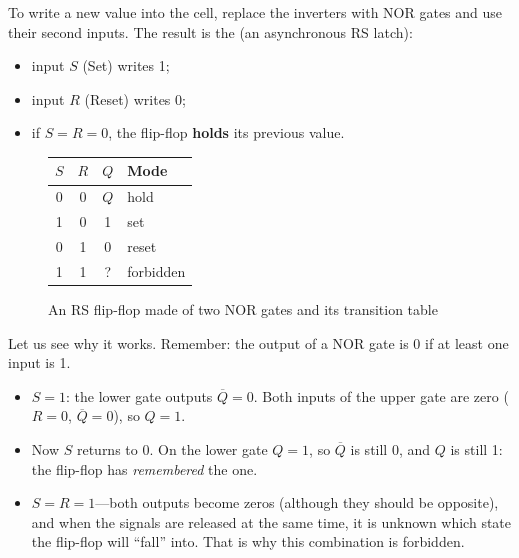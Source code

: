 To write a new value into the cell, replace the inverters with NOR gates and
use their second inputs. The result is the 
(an asynchronous RS latch):
\begin{itemize}
  \item input $S$ (Set) writes 1;
  \item input $R$ (Reset) writes 0;
  \item if $S = R = 0$, the flip-flop \textbf{holds} its previous value.
\end{itemize}

\begin{figure}[H]
\centering
\begin{minipage}{0.48\textwidth}
\centering
{}
\end{minipage}\hfill
\begin{minipage}{0.48\textwidth}
\centering
\begin{tabular}{cc|c|l}
\toprule
$S$ & $R$ & $Q$ & \textbf{Mode} \\
\midrule
0 & 0 & $Q$ & hold \\
1 & 0 & 1 & set \\
0 & 1 & 0 & reset \\
1 & 1 & \textcolor{FpgaRed}{?} & \textcolor{FpgaRed}{forbidden} \\
\bottomrule
\end{tabular}
\end{minipage}
\caption{An RS flip-flop made of two NOR gates and its transition table}
\label{fig:rs}
\end{figure}

Let us see why it works. Remember: the output of a NOR gate is 0 if at least
one input is 1.
\begin{itemize}
  \item $S=1$: the lower gate outputs $\overline{Q}=0$. Both inputs of the upper
        gate are zero ($R=0$, $\overline{Q}=0$), so $Q=1$.
  \item Now $S$ returns to 0. On the lower gate $Q=1$, so $\overline{Q}$ is
        still 0, and $Q$ is still 1: the flip-flop has
        \emph{remembered} the one.
  \item $S=R=1$---both outputs become zeros (although they should be
        opposite), and when the signals are released at the same time, it is
        unknown which state the flip-flop will ``fall'' into. That is why this
        combination is forbidden.
\end{itemize}

